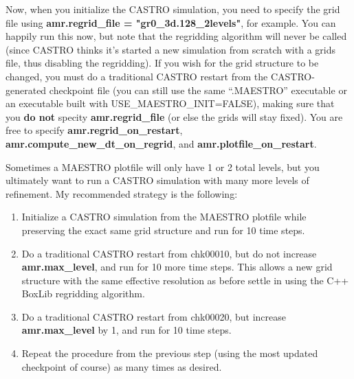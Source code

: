 Now, when you initialize the CASTRO simulation, you need to specify the grid file using {\bf amr.regrid\_file = "gr0\_3d.128\_2levels"}, for example.  You can happily run this now, but note that the regridding algorithm will never be called (since CASTRO thinks it's started a new simulation from scratch with a grids file, thus disabling the regridding).  If you wish for the grid structure to be changed, you must do a traditional CASTRO restart from the CASTRO-generated checkpoint file (you can still use the same ``.MAESTRO'' executable or an executable built with USE\_MAESTRO\_INIT=FALSE), making sure that you {\bf do not} specity {\bf amr.regrid\_file} (or else the grids will stay fixed).  You are free to specify {\bf amr.regrid\_on\_restart}, {\bf amr.compute\_new\_dt\_on\_regrid}, and {\bf amr.plotfile\_on\_restart}.

Sometimes a MAESTRO plotfile will only have 1 or 2 total levels, but you ultimately want to run a CASTRO simulation with many more levels of refinement.  My recommended strategy is the following:
\begin{enumerate}
\item Initialize a CASTRO simulation from the MAESTRO plotfile while preserving the exact same grid structure and run for 10 time steps.
\item Do a traditional CASTRO restart from chk00010, but do not increase {\bf amr.max\_level}, and run for 10 more time steps.  This allows a new grid structure with the same effective resolution as before settle in using the C++ BoxLib regridding algorithm.
\item Do a traditional CASTRO restart from chk00020, but increase {\bf amr.max\_level} by 1, and run for 10 time steps.
\item Repeat the procedure from the previous step (using the most updated checkpoint of course) as many times as desired.
\end{enumerate}
